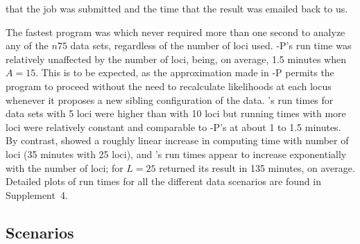 \documentclass[11pt]{article}
\begin{document}
{\begin{table}
{that the job was submitted and the time that the result was emailed back to us. }
\end{table}
The fastest program was \familyfinder{} which never required more than one second to analyze any of the 
$n75$ data sets, regardless of the number of loci used.   \colony{}-P's run time was relatively 
unaffected by the number of loci, being, on average, 1.5 minutes when $A=15$.  This is to be expected, 
as the approximation made in \colony{}-P permits the program to proceed without the need to recalculate 
likelihoods at each locus whenever it proposes a new sibling configuration of the data.  \prt{}'s run 
times for data sets with 5 loci were higher than with 10 loci but running times with more loci were 
relatively constant and comparable to \colony-{}P's at about 1 to 1.5 minutes. By contrast, \colony{} 
showed a roughly linear increase in computing time with number of loci (35 minutes with 25 loci), and 
\kinalyzer{}'s run times appear to increase exponentially with the number of loci; for $L=25$  
\kinalyzer{} returned its result in 135 minutes, on average.  Detailed plots of run times for all the 
different data scenarios are found in Supplement~4.




\subsection{\lottalarge{} Scenarios}
%



}
\end{document}
